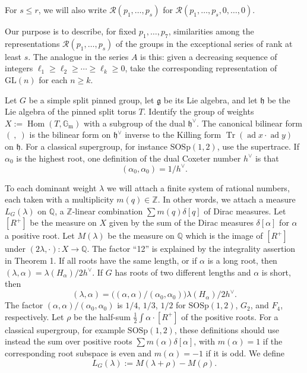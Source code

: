 \documentclass[11pt,a4paper]{article}
\theoremstyle{plain}
\theoremstyle{definition}
\DeclareMathOperator{\Tr}{Tr}
\DeclareMathOperator{\ad}{ad}
\DeclareMathOperator{\Hom}{Hom}
\begin{document}
For $s\leq r$, we will also write $\mathcal R(p_1,\ldots,p_s)$ for $\mathcal R(p_1,\ldots,p_s,0,\ldots,0)$.

Our purpose is to describe, for fixed $p_1,\ldots,p_7$, similarities among the representations $\mathcal R(p_1,\ldots,p_s)$ of the groups in the exceptional series of rank at least $s$. The analogue in the series $A$ is this: given a decreasing sequence of integers $\ell_1\geq \ell_2\geq\cdots\geq \ell_k\geq0$, take the corresponding representation of $\mathrm{GL}(n)$ for each $n\geq k$.

\bigskip

Let $G$ be a simple split pinned group, let $\mathfrak g$ be its Lie algebra, and let $\mathfrak h$ be the Lie algebra of the pinned split torus $T$. Identify the group of weights $X:=\Hom(T,\mathbb G_{\mathrm m})$ with a subgroup of the dual $\mathfrak h^\vee$. The canonical bilinear form $(\ ,\ )$ is the bilinear form on $\mathfrak h^\vee$ inverse to the Killing form $\Tr(\ad x\cdot\ad y)$ on $\mathfrak h$. For a classical supergroup, for instance $\mathrm{SOSp}(1,2)$, use the supertrace. If $\alpha_0$ is the highest root, one definition of the dual Coxeter number $h^\vee$ is that
\[
(\alpha_0,\alpha_0)=1/h^\vee.
\]

To each dominant weight $\lambda$ we will attach a finite system of rational numbers, each taken with a multiplicity $m(q)\in\mathbb Z$. In other words, we attach a measure $L_G(\lambda)$ on $\mathbb Q$, a $\mathbb Z$-linear combination $\sum m(q)\delta[q]$ of Dirac measures. Let $[R^+]$ be the measure on $X$ given by the sum of the Dirac measures $\delta[\alpha]$ for $\alpha$ a positive root. Let $M(\lambda)$ be the measure on $\mathbb Q$ which is the image of $[R^+]$ under $(2\lambda,\cdot):X\to\mathbb Q$. The factor ``12'' is explained by the integrality assertion in Theorem 1. If all roots have the same length, or if $\alpha$ is a long root, then $(\lambda,\alpha)=\lambda(H_\alpha)/2h^\vee$. If $G$ has roots of two different lengths and $\alpha$ is short, then
\[
(\lambda,\alpha)=\bigl((\alpha,\alpha)/(\alpha_0,\alpha_0)\bigr)\lambda(H_\alpha)/2h^\vee.
\]
The factor $(\alpha,\alpha)/(\alpha_0,\alpha_0)$ is $1/4$, $1/3$, $1/2$ for $\mathrm{SOSp}(1,2)$, $G_2$, and $F_4$, respectively. Let $\rho$ be the half-sum $\frac12\int \alpha\cdot [R^+]$ of the positive roots. For a classical supergroup, for example $\mathrm{SOSp}(1,2)$, these definitions should use instead the sum over positive roots $\sum m(\alpha)\delta[\alpha]$, with $m(\alpha)=1$ if the corresponding root subspace is even and $m(\alpha)=-1$ if it is odd. We define
\begin{equation}\label{eq:1}
L_G(\lambda):=M(\lambda+\rho)-M(\rho).
\end{equation}
\end{document}

